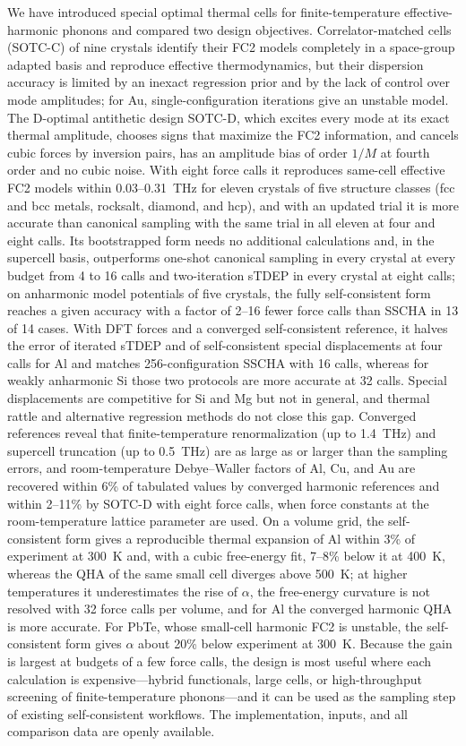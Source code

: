 \documentclass[aip,jap,reprint,amsmath,amssymb,floatfix]{revtex4-2}
\begin{document}
We have introduced special optimal thermal cells for finite-temperature
effective-harmonic phonons and compared two design objectives. Correlator-matched
cells (SOTC-C) of nine crystals identify their FC2 models completely in a
space-group adapted basis and reproduce effective thermodynamics, but their
dispersion accuracy is limited by an inexact regression prior and by the lack
of control over mode amplitudes; for Au, single-configuration iterations
give an unstable model. The D-optimal antithetic design SOTC-D, which
excites every mode at its exact thermal amplitude, chooses signs that maximize
the FC2 information, and cancels cubic forces by inversion pairs, has an
amplitude bias of order $1/M$ at fourth order and no cubic noise. With eight force calls
it reproduces same-cell effective FC2 models within 0.03--0.31~THz for eleven
crystals of five structure classes (fcc and bcc metals, rocksalt, diamond,
and hcp), and with an updated trial it is more accurate than canonical
sampling with the same trial in all eleven at four and eight calls. Its
bootstrapped form needs no additional calculations and, in the supercell
basis, outperforms one-shot
canonical sampling in every crystal at every budget from 4 to 16 calls and
two-iteration sTDEP in every crystal at eight calls; on anharmonic model
potentials of five crystals, the fully self-consistent form reaches a given
accuracy with a factor of 2--16 fewer force calls than SSCHA in 13 of 14
cases. With DFT forces and a converged self-consistent reference, it halves
the error of iterated sTDEP and of self-consistent special displacements at
four calls for Al and matches 256-configuration SSCHA with 16 calls, whereas
for weakly anharmonic Si those two protocols are more accurate at 32 calls.
Special displacements are competitive for Si and Mg but not in
general, and thermal rattle and alternative regression methods do not close
this gap. Converged references reveal that
finite-temperature renormalization (up to 1.4~THz) and supercell truncation
(up to 0.5~THz) are as large as or larger than the sampling errors, and
room-temperature Debye--Waller factors of Al, Cu, and Au are recovered within
6\% of tabulated values by converged harmonic references and within 2--11\%
by SOTC-D with eight force calls, when force constants at the
room-temperature lattice parameter are used. On a volume grid, the self-consistent
form gives a reproducible thermal expansion of Al within 3\% of experiment
at 300~K and, with a cubic free-energy fit, 7--8\% below it at 400~K, whereas the QHA of the same small cell diverges above 500~K;
at higher temperatures it underestimates the rise of $\alpha$, the
free-energy curvature is not resolved with 32 force calls per volume, and
for Al the converged harmonic QHA is more accurate. For PbTe, whose
small-cell harmonic FC2 is unstable, the self-consistent form gives
$\alpha$ about 20\% below experiment at 300~K. Because the gain is
largest at budgets of a few force calls, the design is most useful where each
calculation is expensive---hybrid functionals, large cells, or
high-throughput screening of finite-temperature phonons---and it can be used
as the sampling step of existing self-consistent workflows. The
implementation, inputs, and all comparison data are openly available.
\end{document}
